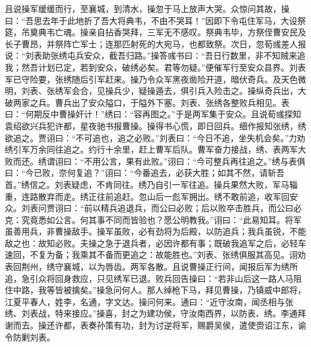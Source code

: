 且说操军缓缓而行，至襄城，到清水，操忽于马上放声大哭。众惊问其故，操曰：“吾思去年于此地折了吾大将典韦，不由不哭耳！”因即下令屯住军马，大设祭筵，吊奠典韦亡魂。操亲自拈香哭拜，三军无不感叹。祭典韦毕，方祭侄曹安民及长子曹昂，并祭阵亡军士；连那匹射死的大宛马，也都致祭。次日，忽荀彧差人报说：“刘表助张绣屯兵安众，截吾归路。”操答彧书曰：“吾日行数里，非不知贼来追我；然吾计划已定，若到安众，破绣必矣。君等勿疑。”便催军行至安众县界。刘表军已守险要，张绣随后引军赶来。操乃令众军黑夜凿险开道，暗伏奇兵。及天色微明，刘表、张绣军会合，见操兵少，疑操遁去，俱引兵入险击之。操纵奇兵出，大破两家之兵。曹兵出了安众隘口，于隘外下塞。刘表、张绣各整败兵相见。表曰：“何期反中曹操奸计！”绣曰：“容再图之。”于是两军集于安众。且说荀彧探知袁绍欲兴兵犯许都，星夜驰书报曹操。操得书心慌，即日回兵。细作报知张绣，绣欲追之。贾诩曰：“不可追也，追之必败。”刘表曰：“今日不追，坐失机会矣。”力劝绣引军万余同往追之。约行十余里，赶上曹军后队。曹军奋力接战，绣、表两军大败而还。绣谓诩曰：“不用公言，果有此败。”诩曰：“今可整兵再往追之。”绣与表俱曰：“今已败，奈何复追？”诩曰：“今番追去，必获大胜；如其不然，请斩吾首。”绣信之。刘表疑虑，不肯同往。绣乃自引一军往追。操兵果然大败，军马辎重，连路散弃而走。绣正往前追赶。忽山后一彪军拥出。绣不敢前追，收军回安众。刘表问贾诩曰：“前以精兵追退兵，而公曰必败；后以败卒击胜兵，而公曰必克：究竟悉如公言。何其事不同而皆验也？愿公明教我。”诩曰：“此易知耳。将军虽善用兵，非曹操敌手。操军虽败，必有劲将为后殿，以防追兵；我兵虽锐，不能敌之也：故知必败。夫操之急于退兵者，必因许都有事；既破我追军之后，必轻车速回，不复为备；我乘其不备而更追之：故能胜也。”刘表、张绣俱服其高见。诩劝表回荆州，绣守襄城，以为唇齿。两军各散。且说曹操正行间，闻报后军为绣所追，急引众将回身救应，只见绣军已退。败兵回告操曰：“若非山后这一路人马阻住中路，我等皆被擒矣。”操急问何人。那人绰枪下马，拜见曹操，乃镇威中郎将，江夏平春人，姓李，名通，字文达。操问何来。通曰：“近守汝南，闻丞相与张绣、刘表战，特来接应。”操喜，封之为建功侯，守汝南西界，以防表、绣。李通拜谢而去。操还许都，表奏孙策有功，封为讨逆将军，赐爵吴侯，遣使赍诏江东，谕令防剿刘表。

